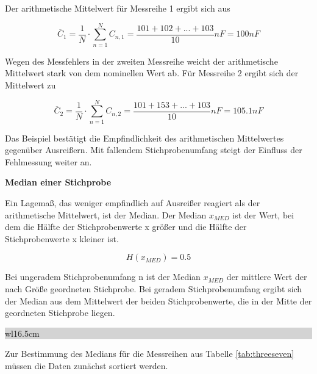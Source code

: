 \noindent Der arithmetische Mittelwert f\"{u}r Messreihe 1 ergibt sich aus 

\begin{equation}\label{eq:threenineteen}
\overline{C}_{1} =\dfrac{1}{N} \cdot \sum _{n=1}^{N}C_{n,1}  =\dfrac{101+102+...+103}{10} nF= 100 nF
\end{equation}

\noindent Wegen des Messfehlers in der zweiten Messreihe weicht der arithmetische Mittelwert stark von dem nominellen Wert ab. F\"{u}r Messreihe 2 ergibt sich der Mittelwert zu

\begin{equation}\label{eq:threetwenty}
\overline{C}_{2} =\dfrac{1}{N} \cdot \sum _{n=1}^{N}C_{n,2}  =\dfrac{101+153+...+103}{10} nF= 105.1 nF
\end{equation}

\noindent Das Beispiel best\"{a}tigt die Empfindlichkeit des arithmetischen Mittelwertes gegen\"{u}ber Ausrei{\ss}ern. Mit fallendem Stichprobenumfang steigt der Einfluss der Fehlmessung weiter an. \bigskip

{\selectfont
\noindent\textbf{Median einer Stichprobe}}\smallskip

\noindent Ein Lagema{\ss}, das weniger empfindlich auf Ausrei{\ss}er reagiert als der arithmetische Mittelwert, ist der Median. Der Median $x_{MED}$ ist der Wert, bei dem die H\"{a}lfte der Stichprobenwerte x gr\"{o}{\ss}er und die H\"{a}lfte der Stichprobenwerte x kleiner ist. 

\begin{equation}\label{eq:threetwentyone}
H(x_{MED})=0.5
\end{equation}

\noindent Bei ungeradem Stichprobenumfang n ist der Median $x_{MED}$ der mittlere Wert der nach Gr\"{o}{\ss}e geordneten Stichprobe. Bei geradem Stichprobenumfang ergibt sich der Median aus dem Mittelwert der beiden Stichprobenwerte, die in der Mitte der geordneten Stichprobe liegen.

\clearpage

\noindent
\colorbox{lightgray}{%
%
\renewcommand\arraystretch{0.6}%
\begin{tabular}{ wl{16.5cm} }
{\selectfont
{}}
\end{tabular}%
}\bigskip

\noindent Zur Bestimmung des Medians f\"{u}r die Messreihen aus Tabelle \ref{tab:threeseven} m\"{u}ssen die Daten zun\"{a}chst sortiert werden.

